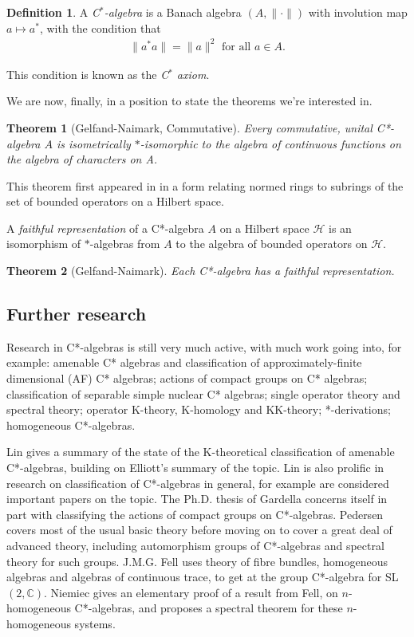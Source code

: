 \documentclass[12pt,a4paper]{amsart}
\theoremstyle{plain}
\newtheorem*{thm*}{Theorem}
\theoremstyle{definition}
\newtheorem*{defn*}{Definition}
\begin{document}
\begin{defn*}
A \emph{C$^\ast$-algebra} is a Banach algebra $(A, \| \cdot \|)$ with involution map $a \mapsto a^\ast$, with the condition that
\begin{align*}
	\|a ^\ast a\| = \|a\|^2 \mbox{ for all } a \in A.
\end{align*}
\end{defn*}
\noindent This condition is known as the \emph{C$^\ast$ axiom}. 


We are now, finally, in a position to state the theorems we're interested in.

\begin{thm*}[Gelfand-Naimark, Commutative]
	Every commutative, unital C*-algebra $A$ is isometrically $\ast$-isomorphic to the algebra of continuous functions on the algebra of characters on A.
\end{thm*}

This theorem first appeared in \cite{gelfand43} in a form relating normed rings to subrings of the set of bounded operators on a Hilbert space.

A \emph{faithful representation} of a C*-algebra $A$ on a Hilbert space $\mathcal{H}$ is an isomorphism of $\ast$-algebras from $A$ to the algebra of bounded operators on $\mathcal{H}$.
\begin{thm*}[Gelfand-Naimark]
	Each C*-algebra has a faithful representation.
\end{thm*}


\subsection{Further research}
	Research in C*-algebras is still very much active, with much work going into, for example: 
	amenable C* algebras and classification of approximately-finite dimensional (AF) C* algebras; 
	actions of compact groups on C* algebras; 
	classification of separable simple nuclear C* algebras; 
	single operator theory and spectral theory; 
	operator K-theory, K-homology and KK-theory; 
	*-derivations;
	homogeneous C*-algebras.
	
	
	Lin \cite{lin01} gives a summary of the state of the K-theoretical classification of amenable C*-algebras, building on Elliott's summary \cite{elliott94} of the topic. 
	Lin is also prolific in research on classification of C*-algebras in general, for example \cite{lin08,lin11} are considered important papers on the topic.
	The Ph.D. thesis of Gardella \cite{gardella15} concerns itself in part with classifying the actions of compact groups on C*-algebras.
	Pedersen \cite{pedersen79} covers most of the usual basic theory before moving on to cover a great deal of advanced theory, including automorphism groups of C*-algebras and spectral theory for such groups.
	J.M.G. Fell \cite{fell61} uses theory of fibre bundles, homogeneous algebras and algebras of continuous trace, to get at the group C*-algebra for SL$(2,\mathbb{C})$.
	Niemiec \cite{niemiec12} gives an elementary proof of a result \cite[Theorem 3.2]{fell61} from Fell, on $n$-homogeneous C*-algebras, and proposes a spectral theorem for these $n$-homogeneous systems.
	
\end{document}
